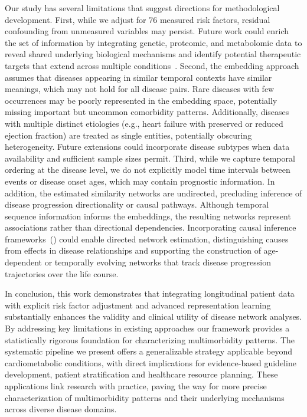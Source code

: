 Our study has several limitations that suggest directions for methodological development. First, while we adjust for 76 measured risk factors, residual confounding from unmeasured variables may persist. Future work could enrich the set of information by integrating genetic, proteomic, and metabolomic data to reveal shared underlying biological mechanisms and identify potential therapeutic targets that extend across multiple conditions~\citep{Sibilio2025, nam2020network}. Second, the embedding approach assumes that diseases appearing in similar temporal contexts have similar meanings, which may not hold for all disease pairs. Rare diseases with few occurrences may be poorly represented in the embedding space, potentially missing important but uncommon comorbidity patterns. Additionally, diseases with multiple distinct etiologies (e.g., heart failure with preserved or reduced ejection fraction) are treated as single entities, potentially obscuring heterogeneity. Future extensions could incorporate disease subtypes when data availability and sufficient sample sizes permit. Third, while we capture temporal ordering at the disease level, we do not explicitly model time intervals between events or disease onset ages, which may contain prognostic information. In addition, the estimated similarity networks are undirected, precluding inference of disease progression directionality or causal pathways. Although temporal sequence information informs the embeddings, the resulting networks represent associations rather than directional dependencies. 
Incorporating causal inference frameworks~(\citealp{pearl2009causality, prosperi2020causal, xu2019patient, kong_causal}) could enable directed network estimation, distinguishing causes from effects in disease relationships and supporting the construction of age-dependent or temporally evolving networks that track disease progression trajectories over the life course.

In conclusion, this work demonstrates that integrating longitudinal patient data with explicit risk factor adjustment and advanced representation learning substantially enhances the validity and clinical utility of disease network analyses. By addressing key limitations in existing approaches our framework provides a statistically rigorous foundation for characterizing multimorbidity patterns. The systematic pipeline we present offers a generalizable strategy applicable beyond cardiometabolic conditions, with direct implications for evidence-based guideline development, patient stratification and healthcare resource planning. These applications link research with practice, paving the way for more precise characterization of multimorbidity patterns and their underlying mechanisms across diverse disease domains.


